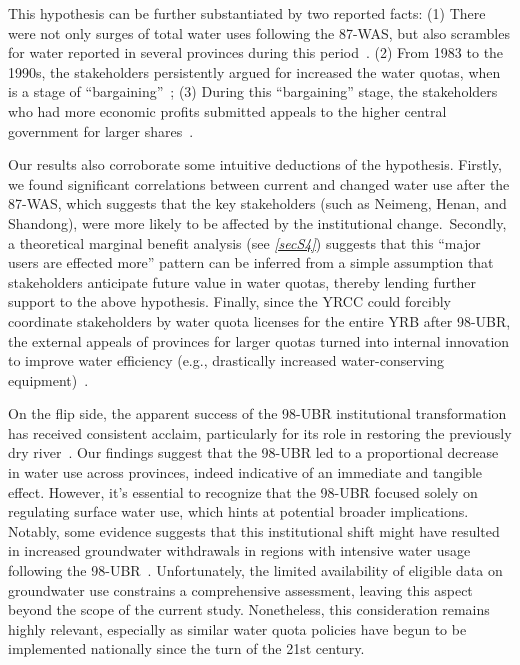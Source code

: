 This hypothesis can be further substantiated by two reported facts:
(1) There were not only surges of total water uses following the 87-WAS, but also scrambles for water reported in several provinces during this period~\cite{mao2000, bouckaert2022}.
(2) From 1983 to the 1990s, the stakeholders persistently argued for increased the water quotas, when is a stage of ``bargaining''~\cite{wang2019e, wang2019d};
(3) During this ``bargaining'' stage, the stakeholders who had more economic profits submitted appeals to the higher central government for larger shares~\cite{wang2019e, wang2019d}.

Our results also corroborate some intuitive deductions of the hypothesis.
Firstly, we found significant correlations between current and changed water use after the 87-WAS, which suggests that the key stakeholders (such as Neimeng, Henan, and Shandong), were more likely to be affected by the institutional change.\
Secondly, a theoretical marginal benefit analysis (see \textit{\ref{secS4}}) suggests that this ``major users are effected more'' pattern can be inferred from a simple assumption that stakeholders anticipate future value in water quotas, thereby lending further support to the above hypothesis.
Finally, since the YRCC could forcibly coordinate stakeholders by water quota licenses for the entire YRB after 98-UBR, the external appeals of provinces for larger quotas turned into internal innovation to improve water efficiency (e.g., drastically increased water-conserving equipment)~\cite{krieger1955, ostrom1990}.

On the flip side, the apparent success of the 98-UBR institutional transformation has received consistent acclaim, particularly for its role in restoring the previously dry river~\cite{wang2019e, wang2019d}.
Our findings suggest that the 98-UBR led to a proportional decrease in water use across provinces, indeed indicative of an immediate and tangible effect.
However, it's essential to recognize that the 98-UBR focused solely on regulating surface water use, which hints at potential broader implications.
Notably, some evidence suggests that this institutional shift might have resulted in increased groundwater withdrawals in regions with intensive water usage following the 98-UBR~\cite{sun2022b}.
Unfortunately, the limited availability of eligible data on groundwater use constrains a comprehensive assessment, leaving this aspect beyond the scope of the current study.
Nonetheless, this consideration remains highly relevant, especially as similar water quota policies have begun to be implemented nationally since the turn of the 21st century.

